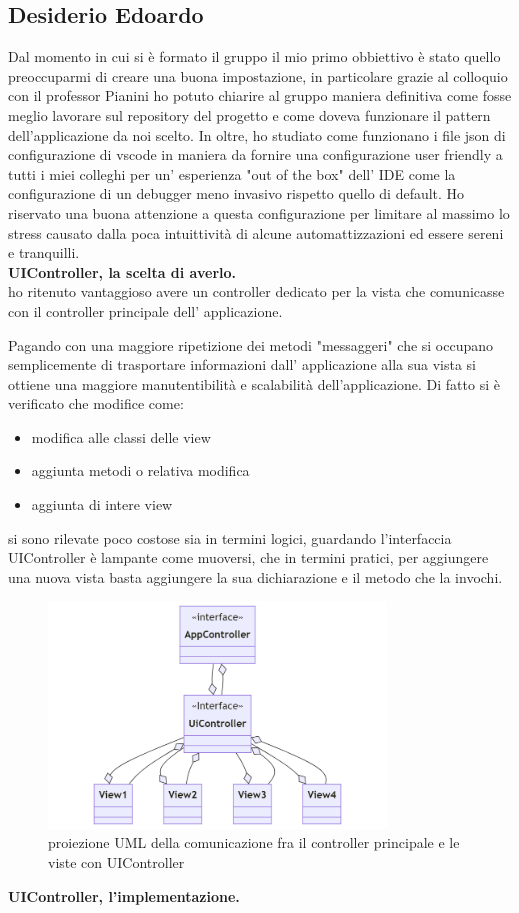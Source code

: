 \documentclass[a4paper,12pt]{report}
\begin{document}
\subsection{Desiderio Edoardo}
Dal momento in cui si è formato il gruppo il mio primo obbiettivo è stato quello preoccuparmi di creare una buona impostazione,
in particolare grazie al colloquio con il professor Pianini ho potuto chiarire al gruppo maniera definitiva come fosse meglio
lavorare sul repository del progetto e come doveva funzionare il pattern dell'applicazione da noi scelto.
In oltre, ho studiato come funzionano i file json di configurazione di vscode in maniera da fornire una configurazione user friendly
a tutti i miei colleghi per un' esperienza "out of the box" dell' IDE come la configurazione di un debugger meno invasivo rispetto quello di  default.
Ho riservato una buona attenzione a questa configurazione per limitare al massimo lo stress causato dalla poca intuittività di alcune
automattizzazioni ed essere sereni e tranquilli.\\
\textbf{UIController, la scelta di averlo.}\\
ho ritenuto vantaggioso avere un controller dedicato per la vista  che comunicasse
con il controller principale dell' applicazione.

Pagando con una maggiore ripetizione dei metodi "messaggeri" che si occupano semplicemente di trasportare informazioni
dall' applicazione alla sua vista si ottiene una maggiore manutentibilità e scalabilità dell'applicazione.
Di fatto si è verificato che modifice come:
\begin{itemize}
    \item modifica alle classi delle view
    \item aggiunta metodi o relativa modifica
    \item aggiunta di intere view
\end{itemize}
si sono rilevate poco costose sia in termini logici, guardando l'interfaccia UIController è lampante come muoversi,
che in termini pratici, per aggiungere una nuova vista basta aggiungere la sua dichiarazione e il metodo che la invochi.
\begin{figure}[H]
    \centering
    \includegraphics[width=0.8\textwidth]{images/UiControllerDesing.png}
    \caption{proiezione UML della comunicazione fra il controller principale e le viste con UIController}
\end{figure}
\textbf{UIController, l'implementazione.}\\
\end{document}
